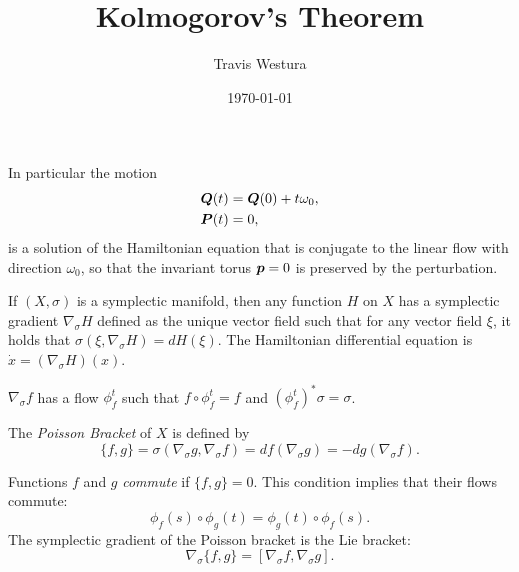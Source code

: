 \documentclass[twoside,letterpaper,10pt]{article}
\title{Kolmogorov's Theorem}
\author{Travis Westura}
\date{\today}
\newcommand{\sgrad}{\nabla_{\sigma}}
\begin{document}
\maketitle

\begin{thm}
  \KAM
\end{thm}
In particular the motion
\begin{align*}
  \bm{Q}(t) &= \bm{Q}(0) + t\omega_0,\\
  \bm{P}(t) &= 0,
\end{align*}
is a solution of the Hamiltonian equation that is conjugate to the linear flow
with direction $\omega_0$, so that the invariant torus $\bm{p} = 0$ is preserved
by the perturbation.

If $(X, \sigma)$ is a symplectic manifold, then any function $H$ on $X$ has a
symplectic gradient $\sgrad H$ defined as the unique vector field such that for
any vector field $\xi$, it holds that $\sigma(\xi, \sgrad H) = d H(\xi)$.
The Hamiltonian differential equation is $\dot{x} = (\sgrad H)(x)$.

$\sgrad f$ has a flow $\phi^t_f$ such that $f \circ \phi^t_f = f$ and
$(\phi^t_f)^* \sigma = \sigma$.

\begin{defn}
The \emph{Poisson Bracket} of $X$ is defined by
  \begin{equation*}
    \{f, g\} = \sigma(\sgrad g, \sgrad f) = df(\sgrad g) = - dg(\sgrad f).
  \end{equation*}
\end{defn}
Functions $f$ and $g$ \emph{commute} if $\{f, g\} = 0$.
This condition implies that their flows commute:
\begin{equation*}
  \phi_f(s) \circ \phi_g(t) = \phi_g(t) \circ \phi_f(s).
\end{equation*}
The symplectic gradient of the Poisson bracket is the Lie bracket:
\begin{equation*}
  \sgrad\{f, g\} = [\sgrad f, \sgrad g].
\end{equation*}
\end{document}
